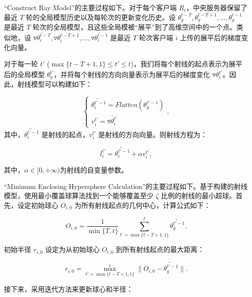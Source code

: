 \documentclass[lettersize,journal]{IEEEtran}
\begin{document}
\begin{enumerate}
“Construct Ray Model”的主要过程如下。对于每个客户端 \(R_i\)，中央服务器保留了最近 \(T\) 轮的全局模型历史以及每轮次的更新变化历史。设 \( \theta_g^{t-T}, \theta_g^{t-T+1}, \dots, \theta_g^{t-1} \) 是最近 \(T\) 轮次的全局模型，且这些全局模被“展平”到了高维空间中的一个点。类似地，设 \( \overline{\triangledown\theta_{i}^{t-T}}, \overline{\triangledown\theta_{i}^{t-T+1}}, \dots, \overline{\triangledown\theta_{i}^{t-1}} \) 是最近 \(T\) 轮次客户端 \(i\) 上传的展平后的梯度变化向量。

对于每一轮 \( t' \) (\( \max\{t-T+1, 1\}\leq  t'\leq t \))，我们将每个射线的起点表示为展平后的全局模型 \( \theta_g^{t'} \)，并将每个射线的方向向量表示为展平后的梯度变化 \( \overline{\triangledown\theta_{i}^{t'}} \)。因此，射线模型可以构建如下：

\begin{equation}
    \left\{\begin{matrix}
    \widetilde{\theta_{i}^{t'-1}} = Flatten(\theta_g^{t'-1})\\
    {v}_{i}^{t'} = \overline{\triangledown\theta_{i}^{t'}}
    \end{matrix}\right.,
\end{equation}
其中，\( \widetilde{\theta_{i}^{t'-1}} \) 是射线的起点，\( {v}_{i}^{t'} \) 是射线的方向向量。则射线方程为：

\begin{equation}
l_i^{t'}=\widetilde{\theta_{i}^{t'-1}}+\alpha {v}_{i}^{t'},
\end{equation}

其中，$\alpha\in [0, +\infty)$为射线的自变量参数。

“Minimum Enclosing Hypersphere Calculation”的主要过程如下。基于构建的射线模型，使用最小覆盖球算法找到一个能够覆盖至少 \( \zeta \) 比例的射线的最小超球。首先，设定初始球心 \( O_{i,0} \) 为所有射线起点的几何中心，计算公式如下：

\begin{equation}
    O_{i,0} = \frac{1}{\min\{T, t\}} \sum_{t'=\max\{t-T+1, 1\}}^{t} \widetilde{\theta_g^{t'-1}}.
\end{equation}

初始半径 \( r_{i,0} \) 设定为从初始球心 \( O_{i,0} \) 到所有射线起点的最大距离：

\begin{equation}
r_{i,0} = \max_{t'=\max\{t-T+1, 1\}}^{t}  \|O_{i,0} - \widetilde{\theta_{g}^{t'-1}}\|.
\end{equation}

接下来，采用迭代方法来更新球心和半径：


\end{enumerate}
\end{document}
